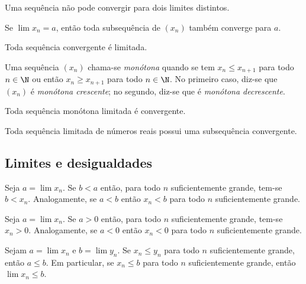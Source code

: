 \documentclass{article}
\begin{document}
\begin{prop}
    Uma sequência não pode convergir para dois limites distintos.
\end{prop}

\begin{prop}
    Se \(\lim x_n = a\), então toda subsequência de \((x_n)\) também converge para \(a\).
\end{prop}

\begin{prop}
    Toda sequência convergente é limitada.
\end{prop}

\begin{defn}
    Uma sequência \((x_n)\) chama-se \emph{monótona} quando se tem \(x_n \leq x_{n+1}\) para todo \(n \in \N\) ou então \(x_n \geq x_{n+1}\) para todo \(n \in \N\). No primeiro caso, diz-se que \((x_n)\) é \emph{monótona crescente}; no segundo, diz-se que é \emph{monótona decrescente}.
\end{defn}

\begin{prop}
    Toda sequência monótona limitada é convergente.
\end{prop}

\begin{cor} 
    Toda sequência limitada de números reais possui uma subsequência convergente.
\end{cor}

\subsection{Limites e desigualdades}

\begin{prop}
    Seja \(a = \lim x_n\). Se \(b < a\) então, para todo \(n\) suficientemente grande, tem-se \(b < x_n\). Analogamente, se \(a < b\) então \(x_n < b\) para todo \(n\) suficientemente grande.
\end{prop}

\begin{cor}
    Seja \(a = \lim x_n\). Se \(a > 0\) então, para todo \(n\) suficientemente grande, tem-se \(x_n > 0\). Analogamente, se \(a < 0\) então \(x_n < 0\) para todo \(n\) suficientemente grande.
\end{cor}

\begin{cor}
    Sejam \(a = \lim x_n\) e \(b = \lim y_n\). Se \(x_n \leq y_n\) para todo \(n\) suficientemente grande, então \(a \leq b\). Em particular, se \(x_n \leq b\) para todo \(n\) suficientemente grande, então \(\lim x_n \leq b\).
\end{cor}
\end{document}
